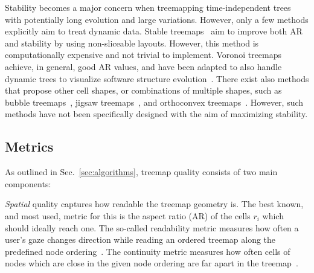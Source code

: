 Stability becomes a major concern when treemapping time-independent trees with potentially long evolution and large variations. However, only a few methods explicitly aim to treat dynamic data. Stable treemaps~\citep{sondag17} aim to improve both AR and stability by using non-sliceable layouts. However, this method is computationally expensive and not trivial to implement. Voronoi treemaps~\citep{balzer05,balzer05b}
achieve, in general, good AR values, and have been adapted to also handle dynamic trees to visualize software structure evolution~\citep{hees17,gotz11}. There exist also methods that propose other cell shapes, or combinations of multiple shapes, such as bubble treemaps~\citep{bubble}, jigsaw treemaps~\citep{jigsaw}, and orthoconvex treemaps~\citep{deberg14}. However, such methods have not been specifically designed with the aim of maximizing stability.


\subsection{Metrics}
\label{sec:metrics-3}
%
As outlined in Sec.~\ref{sec:algorithms}, treemap quality consists of two main components:

\emph{Spatial} quality captures how readable the treemap geometry is. The best known, and most used, metric for this is the aspect ratio (AR) of the cells $r_i$ which should ideally reach one. The so-called readability metric measures how often a user's gaze changes direction while reading an ordered treemap along the predefined node ordering~\citep{bederson02}. The continuity metric measures how often cells of nodes which are close in the given node ordering are far apart in the treemap~\citep{spiral}. %


